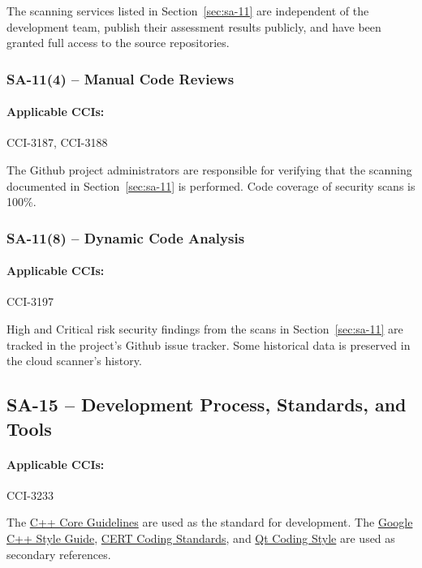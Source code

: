 \documentclass[letterpaper, 10pt, twoside]{article}
\begin{document}
The scanning services listed in Section~\ref{sec:sa-11} are independent of the development team, publish their assessment results publicly, and have been granted full access to the source repositories.

\subsubsection{SA-11(4) -- Manual Code Reviews}

\paragraph{Applicable CCIs:} CCI-3187, CCI-3188

The Github project administrators are responsible for verifying that the scanning documented in Section~\ref{sec:sa-11} is performed. Code coverage of security scans is 100\%.

\subsubsection{SA-11(8) -- Dynamic Code Analysis}

\paragraph{Applicable CCIs:} CCI-3197

High and Critical risk security findings from the scans in Section~\ref{sec:sa-11} are tracked in the project's Github issue tracker. Some historical data is preserved in the cloud scanner's history.

\subsection{SA-15 -- Development Process, Standards, and Tools}

\paragraph{Applicable CCIs:} CCI-3233

The \href{http://isocpp.github.io/CppCoreGuidelines/CppCoreGuidelines#S-functions}{C++ Core Guidelines} are used as the standard for development. The \href{https://google.github.io/styleguide/cppguide.html}{Google C++ Style Guide}, \href{https://resources.sei.cmu.edu/downloads/secure-coding/assets/sei-cert-cpp-coding-standard-2016-v01.pdf}{CERT Coding Standards}, and \href{https://wiki.qt.io/Qt_Coding_Style}{Qt Coding Style} are used as secondary references.
\end{document}
